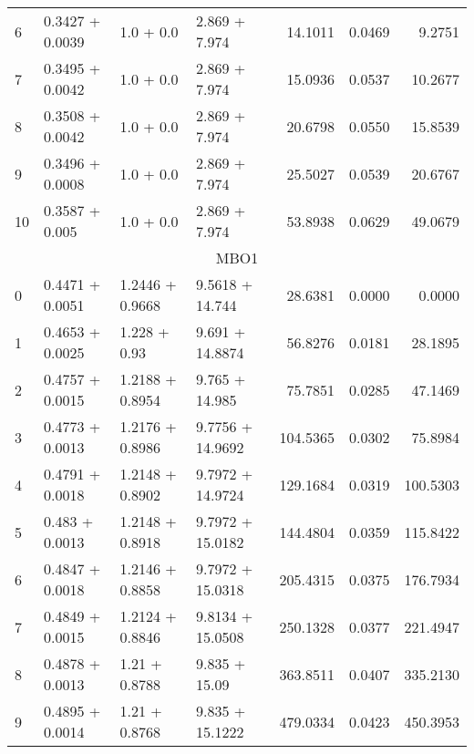 \begin{tabular}{llllrrr}
  6  &  0.3427 + 0.0039 &     1.0 + 0.0 &   2.869 + 7.974 &             14.1011 &                 0.0469 &         9.2751 \\
  7  &  0.3495 + 0.0042 &     1.0 + 0.0 &   2.869 + 7.974 &             15.0936 &                 0.0537 &        10.2677 \\
  8  &  0.3508 + 0.0042 &     1.0 + 0.0 &   2.869 + 7.974 &             20.6798 &                 0.0550 &        15.8539 \\
  9  &  0.3496 + 0.0008 &     1.0 + 0.0 &   2.869 + 7.974 &             25.5027 &                 0.0539 &        20.6767 \\
  10 &   0.3587 + 0.005 &     1.0 + 0.0 &   2.869 + 7.974 &             53.8938 &                 0.0629 &        49.0679 \\
  \midrule
  \multicolumn{7}{c}{MBO1} \\
  \midrule
  0  &  0.4471 + 0.0051 &  1.2446 + 0.9668 &   9.5618 + 14.744 &             28.6381 &                 0.0000 &         0.0000 \\
  1  &  0.4653 + 0.0025 &     1.228 + 0.93 &   9.691 + 14.8874 &             56.8276 &                 0.0181 &        28.1895 \\
  2  &  0.4757 + 0.0015 &  1.2188 + 0.8954 &    9.765 + 14.985 &             75.7851 &                 0.0285 &        47.1469 \\
  3  &  0.4773 + 0.0013 &  1.2176 + 0.8986 &  9.7756 + 14.9692 &            104.5365 &                 0.0302 &        75.8984 \\
  4  &  0.4791 + 0.0018 &  1.2148 + 0.8902 &  9.7972 + 14.9724 &            129.1684 &                 0.0319 &       100.5303 \\
  5  &   0.483 + 0.0013 &  1.2148 + 0.8918 &  9.7972 + 15.0182 &            144.4804 &                 0.0359 &       115.8422 \\
  6  &  0.4847 + 0.0018 &  1.2146 + 0.8858 &  9.7972 + 15.0318 &            205.4315 &                 0.0375 &       176.7934 \\
  7  &  0.4849 + 0.0015 &  1.2124 + 0.8846 &  9.8134 + 15.0508 &            250.1328 &                 0.0377 &       221.4947 \\
  8  &  0.4878 + 0.0013 &    1.21 + 0.8788 &     9.835 + 15.09 &            363.8511 &                 0.0407 &       335.2130 \\
  9  &  0.4895 + 0.0014 &    1.21 + 0.8768 &   9.835 + 15.1222 &            479.0334 &                 0.0423 &       450.3953 \\

\end{tabular}
